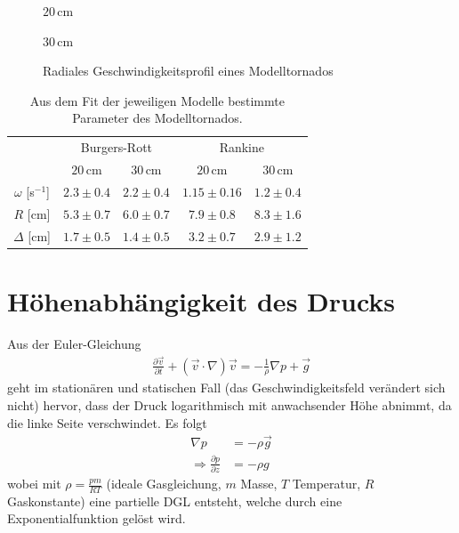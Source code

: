 \documentclass[12pt,a4paper,titlepage,headinclude,bibtotoc]{scrartcl}
\begin{document}
 \begin{figure}[!htb]
	\begin{minipage}{0.5\textwidth}	
		\resizebox{\textwidth}{!}{   		
   		}
   		\caption*{$20\,$cm}
   \end{minipage}   
   \begin{minipage}{0.5\textwidth}   		
		\resizebox{\textwidth}{!}{   		
   		}
   		\caption*{$30\,$cm}
   \end{minipage}
   \caption{Radiales Geschwindigkeitsprofil eines Modelltornados\label{fig:tornado}}
 \end{figure}

 \begin{table}[!htb]
 	\centering
 	\begin{tabular}{|c||c|c||c|c|}
 	\hline
			 	& \multicolumn{2}{c|}{Burgers-Rott}	 	& \multicolumn{2}{c||}{Rankine} 		\\
 				& $20\,$cm 		& $30\,$cm	 	& $20\,$cm 		& $30\,$cm 		\\
 	\hline                                                           
 	$\omega$ [s$^{-1}$]	& $2.3 \pm 0.4$ 	& $2.2 \pm 0.4$	 	& $1.15 \pm 0.16$ 	& $1.2 \pm 0.4$ 	\\
 	$R$ [cm]           	& $5.3 \pm 0.7$ 	& $6.0 \pm 0.7 $ 	& $7.9 \pm 0.8$ 	& $8.3 \pm 1.6$ 	\\
 	$\Delta$ [cm]       	& $1.7  \pm 0.5$ 	& $ 1.4 \pm 0.5$ 	& $3.2 \pm 0.7$ 	& $2.9 \pm 1.2$ 	\\
 	\hline
 	\end{tabular}
	\caption{Aus dem Fit der jeweiligen Modelle bestimmte Parameter des Modelltornados.}
 	\label{tab:tornado}
 \end{table}

\section{Höhenabhängigkeit des Drucks}
Aus der Euler-Gleichung
\begin{align*}
	\frac{\partial\vec v}{\partial t}+(\vec v\cdot\nabla)\vec v = -\frac{1}{\rho}\nabla p+\vec g
\end{align*}
geht im stationären und statischen Fall (das Geschwindigkeitsfeld verändert sich nicht) hervor, dass der Druck logarithmisch mit anwachsender Höhe abnimmt, da die linke Seite verschwindet.
Es folgt
\begin{align*}
	\nabla p&=-\rho\vec g\\
	\Rightarrow \frac{\partial p}{\partial z}&=-\rho g
\end{align*}
wobei mit $\rho=\frac{pm}{RT}$ (ideale Gasgleichung, $m$ Masse, $T$ Temperatur, $R$ Gaskonstante) eine partielle DGL entsteht, welche durch eine Exponentialfunktion gelöst wird.
\end{document}

